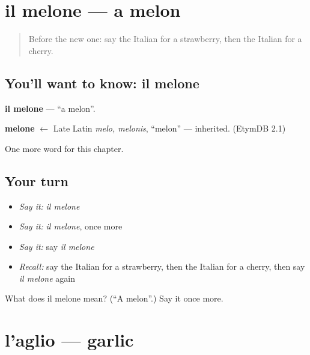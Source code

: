 \section[il melone]{il melone — a melon}

\label{lesson:IT-C107-melone}



\begin{quote}
Before the new one: say the Italian for a strawberry, then the Italian for a cherry.
\end{quote}

\subsection*{You'll want to know: il melone}
\textbf{il melone} — \textquotedblleft{}a melon\textquotedblright{}.

\begin{cousinweb}
\textbf{melone} $\leftarrow$ Late Latin \emph{melo, melonis}, \textquotedblleft{}melon\textquotedblright{} — inherited. (EtymDB 2.1)
\end{cousinweb}

\begin{grammarlens}[title={What you've built}]
One more word for this chapter.
\end{grammarlens}

\subsection*{Your turn}
\begin{itemize}
\raggedright
  \item \emph{Say it:} \emph{il melone}
  \item \emph{Say it:} \emph{il melone}, once more
  \item \emph{Say it:} say \emph{il melone}
  \item \emph{Recall:} say the Italian for a strawberry, then the Italian for a cherry, then say \emph{il melone} again
\end{itemize}

\begin{tcolorbox}[breakable,colback=teal!4,colframe=teal!35!black,title={Before you move on}]
What does il melone mean? (\textquotedblleft{}A melon\textquotedblright{}.) Say it once more.
\end{tcolorbox}
\section[l'aglio]{l'aglio — garlic}

